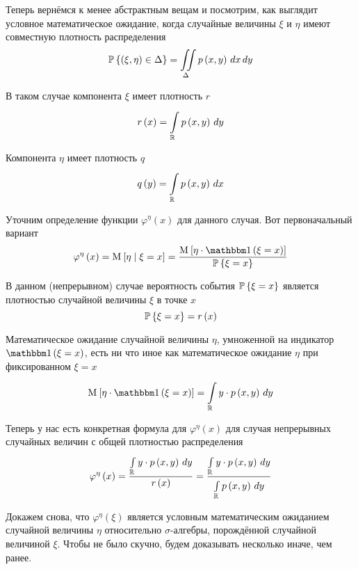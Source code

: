 Теперь вернёмся к менее абстрактным вещам и посмотрим,
как выглядит условное математическое ожидание,
когда случайные величины $\xi$ и $\eta$ имеют совместную плотность распределения
$$\Probability{\left( \xi, \eta \right) \in \Delta}
    = \iint\limits_\Delta\pdf{x,y} \, dx \, dy$$

В таком случае компонента $\xi$ имеет плотность $r$
$$r\left( x \right) = \integral{\mathbb{R}}{}{y}{\pdf{x,y}}$$

Компонента $\eta$ имеет плотность $q$
$$q\left( y \right) = \integral{\mathbb{R}}{}{x}{\pdf{x,y}}$$

Уточним определение функции $\varphi^{\eta}\left( x \right)$
для данного случая. Вот первоначальный вариант
$$\varphi^{\eta}\left( x \right)
    = \Mean{ \eta \mid \xi=x }
    = \frac{\Mean{ \eta \cdot \indicator{\xi=x} }}
        {\Probability{\xi=x}}$$

В данном (непрерывном) случае вероятность события $\Probability{\xi=x}$ является
плотностью случайной величины $\xi$ в точке $x$
$$\Probability{\xi=x} = r\left( x \right)$$

Математическое ожидание случайной величины $\eta$,
умноженной на индикатор $\indicator{\xi=x}$,
есть ни что иное как математическое ожидание $\eta$ при фиксированном $\xi=x$
$$\Mean{ \eta \cdot \indicator{\xi=x} }
    = \integral{\mathbb{R}}{}{y}{y \cdot \pdf{x,y}}$$

Теперь у нас есть конкретная формула для $\varphi^{\eta}\left( x \right)$
для случая непрерывных случайных величин с общей плотностью распределения
\begin{equation}\label{phiIntegral}
    \varphi^{\eta}\left( x \right)
        = \frac{\integral{\mathbb{R}}{}{y}{y \cdot \pdf{x,y}}}
            {r\left( x \right)}
        = \frac{\integral{\mathbb{R}}{}{y}{y \cdot \pdf{x,y}}}
            {\integral{\mathbb{R}}{}{y}{\pdf{x,y}}}
\end{equation}

Докажем снова, что $\varphi^\eta\left( \xi \right)$ является
условным математическим ожиданием случайной величины $\eta$
относительно $\sigma$-алгебры, порождённой случайной величиной $\xi$.
Чтобы не было скучно, будем доказывать несколько иначе, чем ранее.

